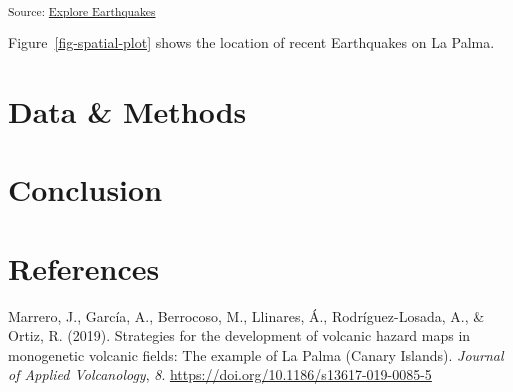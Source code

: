 \documentclass[
]{agujournal2019}
\newlength{\cslhangindent}
\newenvironment{CSLReferences}[2] %
 {\begin{list}{}{%
  \setlength{\itemindent}{0pt}
  \setlength{\leftmargin}{0pt}
  \setlength{\parsep}{0pt}
  \ifodd #1
   \setlength{\leftmargin}{\cslhangindent}
   \setlength{\itemindent}{-1\cslhangindent}
  \fi
  \setlength{\itemsep}{#2\baselineskip}}}
 {\end{list}}
\begin{document}
\textsubscript{Source:
\href{https://pipaber.github.io/Multi-omics/notebooks/explore-earthquakes-preview.html\#cell-fig-spatial-plot}{Explore
Earthquakes}}

Figure~\ref{fig-spatial-plot} shows the location of recent Earthquakes
on La Palma.

\section{Data \& Methods}\label{sec-data-methods}

\section{Conclusion}\label{conclusion}

\section*{References}\label{references}

\label{refs}
\begin{CSLReferences}{1}{0}
\vspace{1em}

Marrero, J., García, A., Berrocoso, M., Llinares, Á., Rodríguez-Losada,
A., \& Ortiz, R. (2019). Strategies for the development of volcanic
hazard maps in monogenetic volcanic fields: The example of {La} {Palma}
({Canary} {Islands}). \emph{Journal of Applied Volcanology}, \emph{8}.
\url{https://doi.org/10.1186/s13617-019-0085-5}

\end{CSLReferences}
\end{document}
